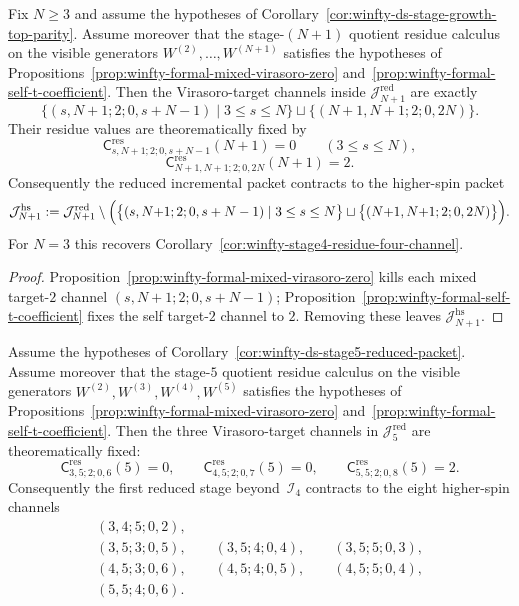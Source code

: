 \begin{proposition}
\label{prop:winfty-stage-growth-virasoro-target-contraction}
Fix $N \ge 3$ and assume the hypotheses of
Corollary~\ref{cor:winfty-ds-stage-growth-top-parity}.  Assume
moreover that the stage-$(N+1)$ quotient residue calculus on the
visible generators
$W^{(2)},\dots,W^{(N+1)}$ satisfies the hypotheses of
Propositions~\ref{prop:winfty-formal-mixed-virasoro-zero}
and~\ref{prop:winfty-formal-self-t-coefficient}.  Then the
Virasoro-target channels inside
$\mathcal{J}_{N+1}^{\mathrm{red}}$ are exactly
\[
\bigl\{
(s,N{+}1;2;0,s+N-1)\mid 3\le s\le N
\bigr\}
\sqcup
\bigl\{
(N{+}1,N{+}1;2;0,2N)
\bigr\}.
\]
Their residue values are theorematically fixed by
\[
\mathsf{C}^{\mathrm{res}}_{s,N+1;2;0,s+N-1}(N+1)=0
\qquad (3\le s\le N),
\]
\[
\mathsf{C}^{\mathrm{res}}_{N+1,N+1;2;0,2N}(N+1)=2.
\]
Consequently the reduced incremental packet contracts to the
higher-spin packet
\[
\mathcal{J}_{N+1}^{\mathrm{hs}}
:=
\mathcal{J}_{N+1}^{\mathrm{red}}
\setminus
\Bigl(
\bigl\{
(s,N{+}1;2;0,s+N-1)\mid 3\le s\le N
\bigr\}
\sqcup
\bigl\{
(N{+}1,N{+}1;2;0,2N)
\bigr\}
\Bigr).
\]
For $N=3$ this recovers
Corollary~\ref{cor:winfty-stage4-residue-four-channel}.
\end{proposition}

\begin{proof}
Proposition~\ref{prop:winfty-formal-mixed-virasoro-zero} kills each mixed target-$2$ channel $(s,N{+}1;2;0,s+N-1)$; Proposition~\ref{prop:winfty-formal-self-t-coefficient} fixes the self target-$2$ channel to $2$.  Removing these leaves $\mathcal{J}_{N+1}^{\mathrm{hs}}$.
\end{proof}

\begin{corollary}
\label{cor:winfty-stage5-residue-eight-channel}
Assume the hypotheses of
Corollary~\ref{cor:winfty-ds-stage5-reduced-packet}.  Assume moreover
that the stage-$5$ quotient residue calculus on the visible generators
$W^{(2)},W^{(3)},W^{(4)},W^{(5)}$ satisfies the hypotheses of
Propositions~\ref{prop:winfty-formal-mixed-virasoro-zero}
and~\ref{prop:winfty-formal-self-t-coefficient}.  Then the three
Virasoro-target channels in $\mathcal{J}_5^{\mathrm{red}}$ are
theorematically fixed:
\[
\mathsf{C}^{\mathrm{res}}_{3,5;2;0,6}(5)=0,
\qquad
\mathsf{C}^{\mathrm{res}}_{4,5;2;0,7}(5)=0,
\qquad
\mathsf{C}^{\mathrm{res}}_{5,5;2;0,8}(5)=2.
\]
Consequently the first reduced stage beyond~$\mathcal{I}_4$ contracts
to the eight higher-spin channels
\[
\begin{gathered}
(3,4;5;0,2),\\
(3,5;3;0,5),\qquad
(3,5;4;0,4),\qquad
(3,5;5;0,3),\\
(4,5;3;0,6),\qquad
(4,5;4;0,5),\qquad
(4,5;5;0,4),\\
(5,5;4;0,6).
\end{gathered}
\]
\end{corollary}

